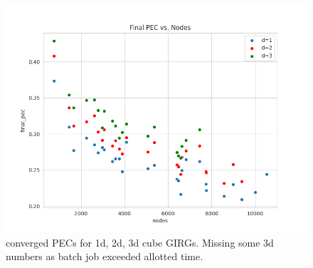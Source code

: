 \begin{figure}
  \centering
  \includegraphics[width=\textwidth]{figures/mcmc_ordered_final_pec.png}
  \caption{converged PECs for 1d, 2d, 3d cube GIRGs. Missing some 3d numbers
  as batch job exceeded allotted time.}
  \label{fig:converged_pecs}
\end{figure}






